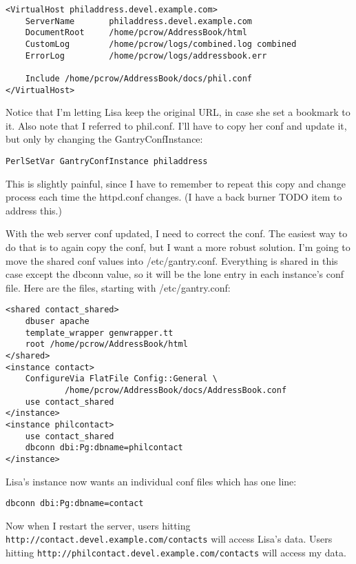 \begin{verbatim}
<VirtualHost philaddress.devel.example.com>
    ServerName       philaddress.devel.example.com
    DocumentRoot     /home/pcrow/AddressBook/html
    CustomLog        /home/pcrow/logs/combined.log combined
    ErrorLog         /home/pcrow/logs/addressbook.err

    Include /home/pcrow/AddressBook/docs/phil.conf
</VirtualHost>
\end{verbatim}

Notice that I'm letting Lisa keep the original URL, in case she set
a bookmark to it.  Also note that I referred to phil.conf.  I'll have to
copy her conf and update it, but only by changing the GantryConfInstance:

\begin{verbatim}
PerlSetVar GantryConfInstance philaddress
\end{verbatim}

This is slightly painful, since I have to remember to repeat this copy and
change process each time the httpd.conf changes.  (I have a back burner
TODO item to address this.)

With the web server conf updated, I need to correct the conf.  The easiest
way to do that is to again copy the conf, but I want a more robust solution.
I'm going to move the shared conf values into /etc/gantry.conf.  Everything
is shared in this case except the dbconn value, so it will be the lone entry
in each instance's conf file.  Here are the files, starting with
/etc/gantry.conf:

\begin{verbatim}
<shared contact_shared>
    dbuser apache
    template_wrapper genwrapper.tt
    root /home/pcrow/AddressBook/html
</shared>
<instance contact>
    ConfigureVia FlatFile Config::General \
            /home/pcrow/AddressBook/docs/AddressBook.conf
    use contact_shared
</instance>
<instance philcontact>
    use contact_shared
    dbconn dbi:Pg:dbname=philcontact
</instance>
\end{verbatim}

Lisa's instance now wants an individual conf files which has one line:

\begin{verbatim}
dbconn dbi:Pg:dbname=contact
\end{verbatim}

Now when I restart the server, users hitting
\verb+http://contact.devel.example.com/contacts+ will access Lisa's
data.  Users hitting \verb+http://philcontact.devel.example.com/contacts+
will access my data.

